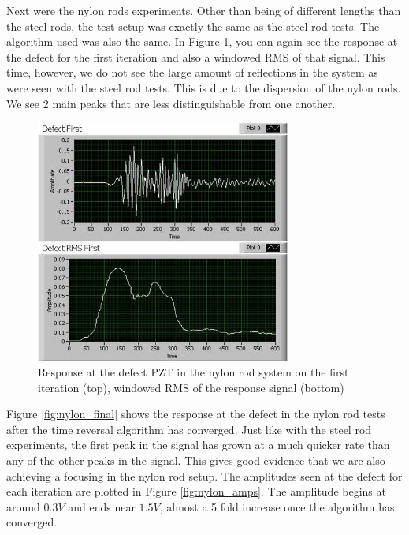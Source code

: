 \documentclass[]{aiaa-tc}%
\begin{document}
Next were the nylon rods experiments. Other than being of different lengths than the steel rods, the test setup was exactly the same as the steel rod tests. The algorithm used was also the same. In Figure \ref{fig:nylon_initial}, you can again see the response at the defect for the first iteration and also a windowed RMS of that signal. This time, however, we do not see the large amount of reflections in the system as were seen with the steel rod tests. This is due to the dispersion of the nylon rods. We see 2 main peaks that are less distinguishable from one another.

\begin{figure}[H]%
\centering
 \includegraphics[height = 8cm]{nylon_initial}
 \caption{Response at the defect PZT in the nylon rod system on the first iteration (top), windowed RMS of the response signal (bottom)}
 \label{fig:nylon_initial}
\end{figure}

Figure \ref{fig:nylon_final} shows the response at the defect in the nylon rod tests after the time reversal algorithm has converged. Just like with the steel rod experiments, the first peak in the signal has grown at a much quicker rate than any of the other peaks in the signal. This gives good evidence that we are also achieving a focusing in the nylon rod setup. The amplitudes seen at the defect for each iteration are plotted in Figure \ref{fig:nylon_amps}. The amplitude begins at around \begin{math}0.3V\end{math} and ends near \begin{math}1.5V\end{math}, almost a 5 fold increase once the algorithm has converged.
\end{document}
